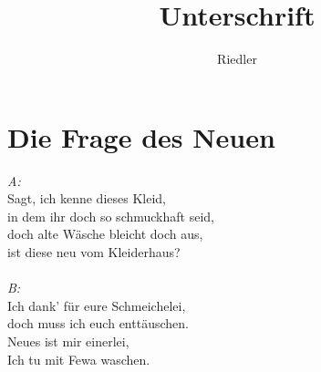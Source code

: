 \documentclass[11pt]{article}
\title{\textbf{Unterschrift}}
\author{Riedler}
\date{}
\begin{document}
\maketitle

\section*{Die Frage des Neuen}

\emph{A:}\\
Sagt, ich kenne dieses Kleid,\\
in dem ihr doch so schmuckhaft seid,\\
doch alte Wäsche bleicht doch aus,\\
ist diese neu vom Kleiderhaus?\\
\\
\emph{B:}\\
Ich dank' für eure Schmeichelei,\\
doch muss ich euch enttäuschen.\\
Neues ist mir einerlei,\\
Ich tu mit Fewa waschen.
\end{document}
